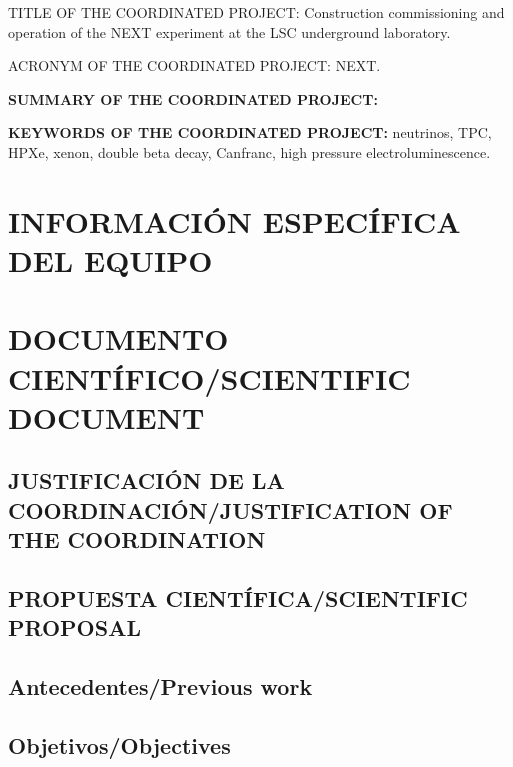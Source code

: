 \documentclass[a4paper,11pt,oneside]{article}
\begin{document}
 \vspace{0.6cm}
{\sc TITLE OF THE COORDINATED PROJECT:} Construction commissioning and operation of the NEXT experiment at the LSC underground laboratory. 
\vspace{0.3cm}

{\sc ACRONYM OF THE COORDINATED PROJECT:} NEXT.
\vspace{0.3cm}

{\bf SUMMARY OF THE COORDINATED PROJECT:} 
\vspace{0.3cm}



 \vspace{0.3cm}

{\bf KEYWORDS OF THE COORDINATED PROJECT:} neutrinos, TPC, HPXe, xenon, double beta decay, Canfranc, high pressure electroluminescence. 

\section{INFORMACIÓN ESPECÍFICA DEL EQUIPO}
\newpage

\section{\bf DOCUMENTO CIENTÍFICO/SCIENTIFIC DOCUMENT}

\subsection{\sc JUSTIFICACIÓN DE LA COORDINACIÓN/JUSTIFICATION OF THE COORDINATION}
\vspace{0.3cm}



\subsection{\bf PROPUESTA CIENTÍFICA/SCIENTIFIC PROPOSAL}



\subsection*{\sc Antecedentes/Previous work}



\subsection*{\sc Objetivos/Objectives}
\end{document}
